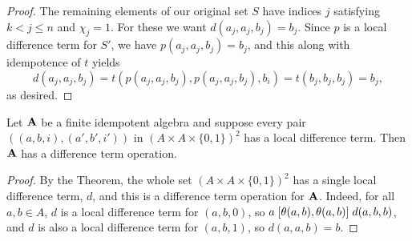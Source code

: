 \begin{proof}
The remaining elements of our original set $S$
have indices $j$ satisfying $k<j\leq n$ and $\chi_j = 1$.
For these we want $d(a_j,a_j,b_j) = b_j$.
Since $p$ is a local difference term for $S'$, we have
$p(a_j,a_j,b_j) = b_j$, and this along with idempotence of $t$ yields
\begin{equation*}
d(a_j,a_j,b_j) =
  t(p(a_j,a_j,b_j), p(a_j,a_j,b_j), b_i)=
  t(b_j, b_j, b_j) =b_j,
\end{equation*}
as desired.
\end{proof}

\begin{cor}
  Let $\mathbf{A}$ be a finite idempotent algebra and suppose every pair
  $((a,b,i), (a',b',i'))$ in $(A\times A \times \{0,1\})^2$ has a local
  difference term.  Then $\mathbf{A}$ has a difference term operation.
\end{cor}
\begin{proof}
  By the Theorem, the whole set $(A\times A \times \{0,1\})^2$ has a single local difference
  term, $d$, and this is a difference term operation for $\mathbf{A}$.  Indeed,
  for all $a, b \in A$, $d$ is a local difference term for $(a,b,0)$, so
  $a \mathrel{[\operatorname{\theta}(a,b), \operatorname{\theta}(a,b)]} d(a,b,b)$, and $d$ is also a local difference term for
  $(a,b,1)$, so $d(a,a,b) = b$.
\end{proof}
